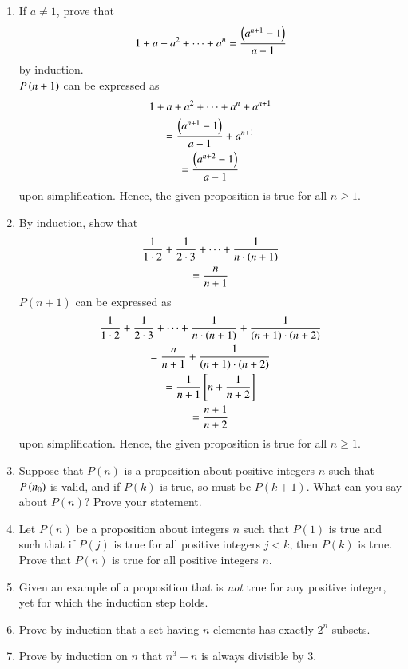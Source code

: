 \begin{enumerate}[label=\arabic*.,ref=\thesubsection.\theenumi]
	\item If $a \ne 1$, prove that 
		\begin{align}
			1 + a + a^2 + \cdots + a^{n} = \frac{\left(a^{n+1}-1\right)}{a-1}
		\end{align}
		by induction.
		\\
		\solution $P\left(n+1\right)$ can be expressed as 
		\begin{multline}
			1 + a + a^2 + \cdots + a^{n} +a^{n+1}
			\\
			= \frac{\left(a^{n+1}-1\right)}{a-1} + a^{n+1}
			\\
			=\frac{\left(a^{n+2}-1\right)}{a-1} 
		\end{multline}
		upon simplification. Hence, the given proposition is true for all $n \ge 1$.
	\item By induction, show that 
		\begin{multline}
			\frac{1}{1\cdot 2}+
			\frac{1}{2\cdot 3}+
\cdots +
			\frac{1}{n\cdot \left(n+1\right)}
			\\
			= \frac{n}{n+1}
		\end{multline}
		\solution $P(n+1)$ can be expressed as
		\begin{multline}
			\frac{1}{1\cdot 2}+
			\frac{1}{2\cdot 3}+
\cdots +
			\frac{1}{n\cdot \left(n+1\right)}+
			\frac{1}{\left(n+1\right)\cdot \left(n+2\right)}
			\\
			= \frac{n}{n+1}+ \frac{1}{\left(n+1\right)\cdot \left(n+2\right)}
			\\
			=
			\frac{1}{n+1}{}\left[n+ \frac{1}{n+2}\right]
			\\
			= \frac{n+1}{n+2}
		\end{multline}
		upon simplification. Hence, the given proposition is true for all $n \ge 1$.
	\item Suppose that $P(n)$ is a proposition about positive integers $n$ such that $P\left(n_0\right)$ is valid, and if $P(k)$ is true, so must be $P(k+1)$. What can you say about $P(n)$?  Prove your statement.
	\item Let $P(n)$ be a proposition about integers $n$ such that $P(1)$ is true and such that if $P(j)$ is true for all positive integers $j < k$, then $P(k)$ is true.  Prove that $P(n)$ is true for all positive integers $n$.
	\item Given an example of  a proposition that is {\em not} true for any positive integer, yet for which the induction step holds.
	\item Prove by induction that a set having $n$ elements has exactly $2^n$ subsets.
	\item Prove by induction on $n$ that $n^3-n$ is always divisible by 3.

\end{enumerate}

